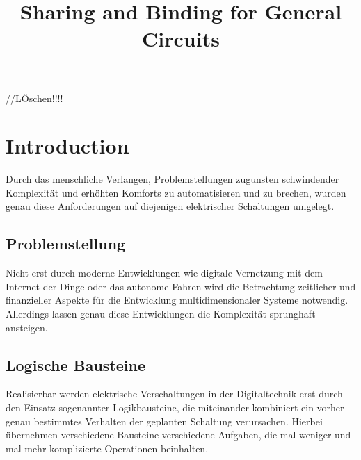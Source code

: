 \documentclass[conference]{IEEEtran}
\begin{document}
\begin{titlepage}

\title{Sharing and Binding for General Circuits\\}

\author{
}
\maketitle
\begin{abstract}

\end{abstract}
\end{titlepage}
\begin{titlepage}
\tableofcontents //LÖschen!!!!
\end{titlepage}


\newpage
\section{Introduction}
Durch das menschliche Verlangen, Problemstellungen zugunsten schwindender Komplexität und erhöhten Komforts zu automatisieren und zu brechen, wurden genau diese Anforderungen auf diejenigen elektrischer Schaltungen umgelegt. 
\subsection{Problemstellung}
Nicht erst durch moderne Entwicklungen wie digitale Vernetzung mit dem Internet der Dinge  oder das autonome Fahren wird die Betrachtung zeitlicher und finanzieller Aspekte für die Entwicklung multidimensionaler Systeme notwendig. Allerdings lassen genau diese Entwicklungen die Komplexität sprunghaft ansteigen.

\subsection{Logische Bausteine}
Realisierbar werden elektrische Verschaltungen in der Digitaltechnik erst durch den Einsatz sogenannter Logikbausteine, die miteinander kombiniert ein vorher genau bestimmtes Verhalten der geplanten Schaltung verursachen.
Hierbei übernehmen verschiedene Bausteine verschiedene Aufgaben, die mal weniger und mal mehr komplizierte Operationen beinhalten. 
\end{document}
